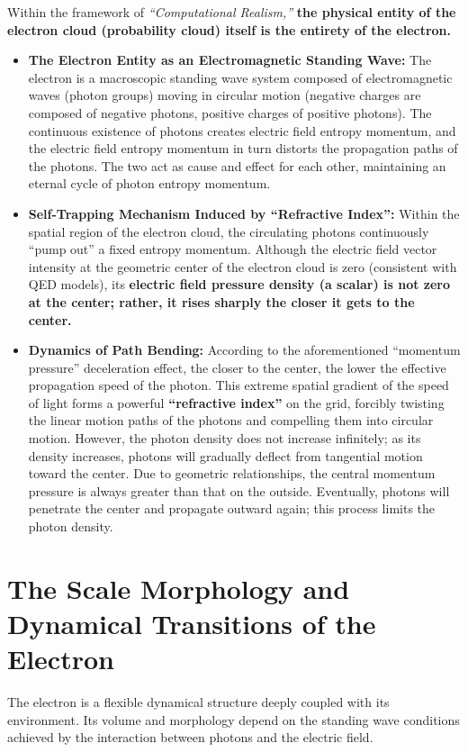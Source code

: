 \documentclass[12pt, a4paper]{article}
\begin{document}
Within the framework of \textit{``Computational Realism,''} \textbf{the physical entity of the electron cloud (probability cloud) itself is the entirety of the electron.}

\begin{itemize}
    \item \textbf{The Electron Entity as an Electromagnetic Standing Wave:} The electron is a macroscopic standing wave system composed of electromagnetic waves (photon groups) moving in circular motion (negative charges are composed of negative photons, positive charges of positive photons). The continuous existence of photons creates electric field entropy momentum, and the electric field entropy momentum in turn distorts the propagation paths of the photons. The two act as cause and effect for each other, maintaining an eternal cycle of photon entropy momentum.
    \item \textbf{Self-Trapping Mechanism Induced by ``Refractive Index'':} Within the spatial region of the electron cloud, the circulating photons continuously ``pump out'' a fixed entropy momentum. Although the electric field vector intensity at the geometric center of the electron cloud is zero (consistent with QED models), its \textbf{electric field pressure density (a scalar) is not zero at the center; rather, it rises sharply the closer it gets to the center.}
    \item \textbf{Dynamics of Path Bending:} According to the aforementioned ``momentum pressure'' deceleration effect, the closer to the center, the lower the effective propagation speed of the photon. This extreme spatial gradient of the speed of light forms a powerful \textbf{``refractive index''} on the grid, forcibly twisting the linear motion paths of the photons and compelling them into circular motion. However, the photon density does not increase infinitely; as its density increases, photons will gradually deflect from tangential motion toward the center. Due to geometric relationships, the central momentum pressure is always greater than that on the outside. Eventually, photons will penetrate the center and propagate outward again; this process limits the photon density.
\end{itemize}

\section{The Scale Morphology and Dynamical Transitions of the Electron}

The electron is a flexible dynamical structure deeply coupled with its environment. Its volume and morphology depend on the standing wave conditions achieved by the interaction between photons and the electric field.
\end{document}
